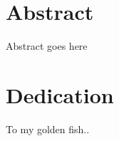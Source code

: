 \documentclass[10pt,twoside]{report}
\begin{document}
\thispagestyle{empty}
\maketitle

\pagestyle{plain}
\cleardoublepage
\chapter*{Abstract}
Abstract goes here
\cleardoublepage
\chapter*{Dedication}
To my golden fish..
\cleardoublepage
\end{document}
